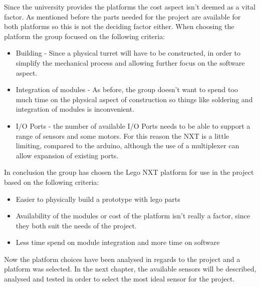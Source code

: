 Since the university provides the platforms the cost aspect isn't deemed as a vital factor. As mentioned before the parts needed for the project
are available for both platforms so this is not the deciding factor either. When choosing the platform the group focused on the following criteria:
\begin{itemize}

  \item Building - Since a physical turret will have to be constructed, in order to simplify the mechanical process and allowing further focus on the software aspect.
  \item Integration of modules - As before, the group doesn't want to spend too much time on the physical aspect of construction so things like soldering and integration of modules
is inconvenient.
  \item I/O Ports - the number of available I/O Ports needs to be able to support a range of sensors and some motors. For this reason the NXT is a little limiting, compared to the arduino, although the use of a multiplexer can allow expansion of existing ports.
\end{itemize}


In conclusion the group has chosen the Lego NXT platform for use in the project based on the following criteria:
\begin{itemize}
  \item Easier to physically build a prototype with lego parts
  \item Availability of the modules or cost of the platform isn't really a factor, since they both suit the needs of the project.
  \item Less time spend on module integration and more time on software
\end{itemize}

Now the platform choices have been analysed in regards to the project and a platform was selected. In the next chapter,
the available sensors will be described, analysed and tested in order to select the most ideal sensor for the project.
